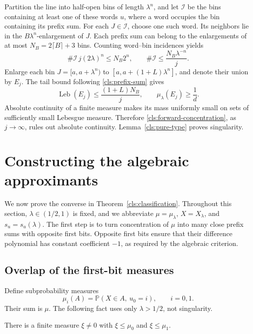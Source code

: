 Partition the line into half-open bins of length $\lambda^n$, and let
$\mathcal I$ be the bins containing at least one of these words $u$,
where a word occupies the bin containing its prefix sum.  For each
$J\in\mathcal I$, choose one such word.  Its neighbors lie in the
$B\lambda^n$-enlargement of $J$.  Each prefix sum can belong to the
enlargements of at most $N_B=2\lceil B\rceil+3$ bins.  Counting
word--bin incidences yields
\[
  \#\mathcal I\,j(2\lambda)^n\leq N_B2^n,
  \qquad
  \#\mathcal I\leq\frac{N_B\lambda^{-n}}j.
\]
Enlarge each bin $J=[a,a+\lambda^n)$ to
$[a,a+(1+L)\lambda^n]$, and denote their union by $E_j$.  The tail bound
following \eqref{cls:prefix-sum} gives
\begin{equation}
  \operatorname{Leb}(E_j)\leq\frac{(1+L)N_B}{j},
  \qquad \mu_\lambda(E_j)\geq\frac1d.
  \label{cls:forward-concentration}
\end{equation}
Absolute continuity of a finite measure makes its mass uniformly small
on sets of sufficiently small Lebesgue measure.  Therefore
\eqref{cls:forward-concentration}, as $j\to\infty$, rules out absolute
continuity.  Lemma~\ref{cls:pure-type} proves singularity.

\section{Constructing the algebraic approximants}
\label{cls:section-converse}

We now prove the converse in Theorem~\ref{cls:classification}.  Throughout
this section, $\lambda\in(1/2,1)$ is fixed, and we abbreviate
$\mu=\mu_\lambda$, $X=X_\lambda$, and $s_u=s_u(\lambda)$.  The first
step is to turn concentration of $\mu$ into many close prefix sums with
opposite first bits.  Opposite first bits ensure that their difference
polynomial has constant coefficient $-1$, as required by the algebraic
criterion.

\subsection{Overlap of the first-bit measures}

Define subprobability measures
\[
  \mu_i(A)=\mathbb P(X\in A,\ u_0=i),\qquad i=0,1.
\]
Their sum is $\mu$.  The following fact uses only $\lambda>1/2$, not
singularity.

\begin{lemma}\label{cls:first-bit-overlap}
There is a finite measure $\xi\ne0$ with $\xi\leq\mu_0$ and
$\xi\leq\mu_1$.
\end{lemma}

